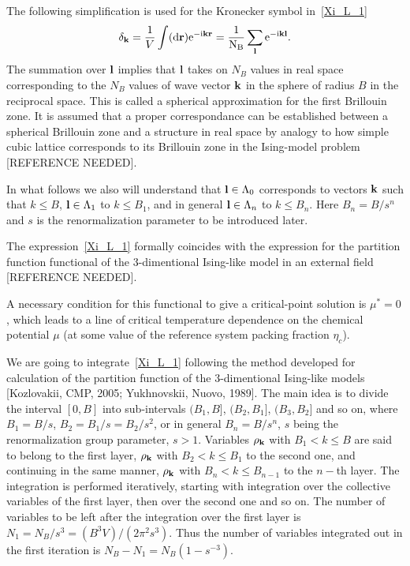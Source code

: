 The following simplification is used for the Kronecker symbol in~\eqref{Xi_L_1}
\begin{equation*}
	\delta_{\vb k} = \frac{1}{V} \int (\rm{d} \vb r) \rm{e}^{-{\rm i} \vb k \vb r} = \frac{1}{N_B}\sum_{\vb l} {\rm e}^{-{\rm i} \vb k \vb l}.
\end{equation*}
The summation over $\vb l$ implies that $\vb l$ takes on $N_B$ values in real space corresponding to the $N_B$ values of wave vector $\vb k$ in the sphere of radius $B$ in the reciprocal space. This is called a spherical approximation for the first Brillouin zone. It is assumed that a proper correspondance can be established between a spherical Brillouin zone and a structure in real space by analogy to how simple cubic lattice corresponds to its Brillouin zone in the Ising-model problem [REFERENCE NEEDED]. 

In what follows we also will understand that $\vb l \in \Lambda_0$ corresponds to vectors $\vb k$ such that $k \leq B$, $\vb l \in \Lambda_1$ to $k \leq B_1$, and in general $\vb l \in \Lambda_n$ to $k \leq B_n$. Here $B_n = B/s^n$ and $s$ is the renormalization parameter to be introduced later.

The expression~\eqref{Xi_L_1} formally coincides with the expression for the partition function functional of the 3-dimentional Ising-like model in an external field [REFERENCE NEEDED]. 

A necessary condition for this functional to give a critical-point solution is $\mu^* = 0$, which leads to a line of critical temperature dependence on the chemical potential $\mu$ (at some value of the reference system packing fraction $\eta_c$).

We are going to integrate~\eqref{Xi_L_1} following the method developed for calculation of the partition function of the 3-dimentional Ising-like models [Kozlovakii, CMP, 2005; Yukhnovskii, Nuovo, 1989]. The main idea is to divide the interval $[0, B]$ into sub-intervals $(B_1, B]$, $(B_2, B_1]$, $(B_3, B_2]$ and so on, where $B_1 = B/s$, $B_2 = B_1/s = B_2/s^2$, or in general $B_n = B/s^n$, $s$ being the renormalization group parameter, $s > 1.$ Variables $\rho_{\vb k}$ with $B_1 < k \leq B$ are said to belong to the first layer, $\rho_{\vb k}$ with $B_2 < k \leq B_1$ to the second one, and continuing in the same manner, $\rho_{\vb k}$ with $B_n < k \leq B_{n-1}$ to the $n-$th layer.
The integration is performed iteratively, starting with integration over the collective variables of the first layer, then over the second one and so on.
The number of variables to be left after the integration over the first layer is $N_1 = N_B / s^3 = (B^3 V)/(2\pi^2 s^3)$. Thus the number of variables integrated out in the first iteration is $N_B - N_1 = N_B(1-s^{-3})$.

